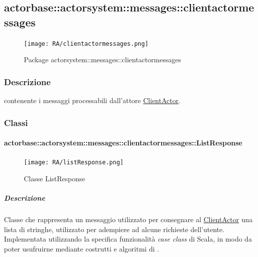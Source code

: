 \documentclass{scalatekids-article}
\begin{document}

\subsection{actorbase::actorsystem::messages::clientactormessages}
\label{sec:actorbase::actorsystem::messages::clientactormessages}

\begin{figure}[H]
  \begin{center}
    \texttt{[image: RA/clientactormessages.png]}
    \caption{Package actorsystem::messages::clientactormessages}
  \end{center}
\end{figure}

\subsubsection{Descrizione}
 contenente i messaggi processabili dall'attore \hyperref[sec:actorbase::actorsystem::actors::clientactor::ClientActor]{ClientActor}.

\subsubsection{Classi}

\paragraph{actorbase::actorsystem::messages::clientactormessages::ListResponse}
\label{sec:actorbase::actorsystem::messages::clientactormessages::ListResponse}

\begin{figure}[H]
  \begin{center}
    \texttt{[image: RA/listResponse.png]}
    \caption{Classe ListResponse}
  \end{center}
\end{figure}

\subparagraph{Descrizione}
Classe che rappresenta un messaggio utilizzato per consegnare al
\hyperref[sec:actorbase::actorsystem::actors::clientactor::ClientActor]{ClientActor} una lista di stringhe, utilizzato per adempiere ad alcune
richieste dell'utente.\\Implementata utilizzando la specifica funzionalità \textit{case class} di Scala,
in modo da poter usufruirne mediante costrutti e algoritmi di
.
\end{document}
